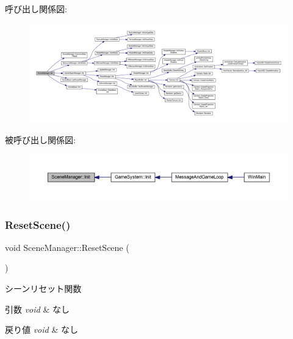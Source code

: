 呼び出し関係図\+:
\nopagebreak
\begin{figure}[H]
\begin{center}
\leavevmode
\includegraphics[width=350pt]{class_scene_manager_a3d14c04a921c6c670e89fbf22a719b00_cgraph}
\end{center}
\end{figure}
被呼び出し関係図\+:
\nopagebreak
\begin{figure}[H]
\begin{center}
\leavevmode
\includegraphics[width=350pt]{class_scene_manager_a3d14c04a921c6c670e89fbf22a719b00_icgraph}
\end{center}
\end{figure}
\mbox{\label{class_scene_manager_a1759161a38025ec8212dc98439fd7335}} 
\subsubsection{\texorpdfstring{Reset\+Scene()}{ResetScene()}}
{\footnotesize\ttfamily void Scene\+Manager\+::\+Reset\+Scene (\begin{DoxyParamCaption}{ }\end{DoxyParamCaption})}



シーンリセット関数 


\begin{DoxyParams}{引数}
{\em void} & なし \\
\hline
\end{DoxyParams}

\begin{DoxyRetVals}{戻り値}
{\em void} & なし \\
\hline
\end{DoxyRetVals}


